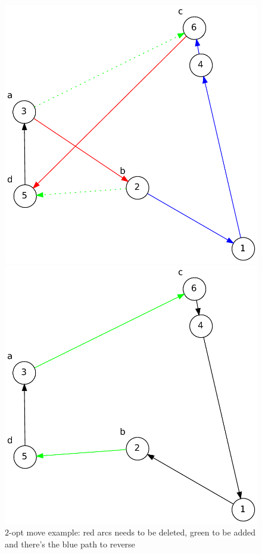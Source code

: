 \begin{figure}[h]
    \centering
    \begin{minipage}{.45\textwidth}
        \centering
        \includegraphics[width=0.8\linewidth]{figures/2move_before.pdf}
    \end{minipage}%
    \begin{minipage}{.45\textwidth}
        \centering
        \includegraphics[width=0.8\linewidth]{figures/2move_after.pdf}
    \end{minipage}
    \caption[$2$-opt move example]{\centering $2$-opt move example: red arcs needs to be deleted, green
    to be added and there's the blue path to reverse}
\end{figure}

